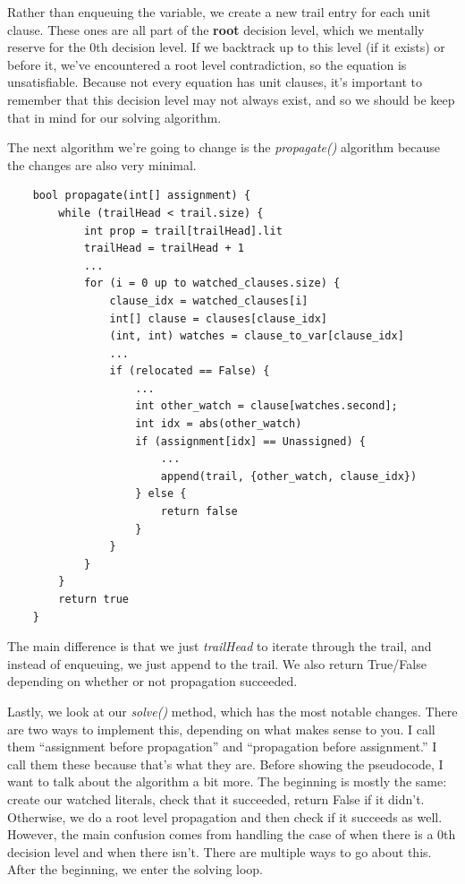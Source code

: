 \documentclass[oneside]{book}
\begin{document}
Rather than enqueuing the variable, we create a new trail entry for each unit 
clause. These ones are all part of the \textbf{root} decision level, which we 
mentally reserve for the 0th decision level. If we backtrack up to this level (if it exists)
or before it, we've encountered a root level contradiction, so the equation is 
unsatisfiable. Because not every equation has unit clauses, it's important to 
remember that this decision level may not always exist, and so we should be 
keep that in mind for our solving algorithm. 

The next algorithm we're going to change is the \textit{propagate()} algorithm 
because the changes are also very minimal.

\begin{lstlisting}
    bool propagate(int[] assignment) {
        while (trailHead < trail.size) {
            int prop = trail[trailHead].lit
            trailHead = trailHead + 1
            ...
            for (i = 0 up to watched_clauses.size) {
                clause_idx = watched_clauses[i]
                int[] clause = clauses[clause_idx]
                (int, int) watches = clause_to_var[clause_idx]
                ...
                if (relocated == False) {
                    ...
                    int other_watch = clause[watches.second];
                    int idx = abs(other_watch)
                    if (assignment[idx] == Unassigned) {
                        ...
                        append(trail, {other_watch, clause_idx})
                    } else {
                        return false
                    }
                }
            }
        }
        return true
    }
\end{lstlisting}

The main difference is that we just \textit{trailHead} to iterate through the trail, and 
instead of enqueuing, we just append to the trail. We also return True/False depending on 
whether or not propagation succeeded.

Lastly, we look at our \textit{solve()} method, which has the most notable changes.
There are two ways to implement this, depending on what makes sense to you. I call 
them ``assignment before propagation'' and ``propagation before assignment.'' I
call them these because that's what they are. Before showing the pseudocode, I 
want to talk about the algorithm a bit more. The beginning is mostly the same:
create our watched literals, check that it succeeded, return False if it didn't. 
Otherwise, we do a root level propagation and then check if it succeeds as well.
However, the main confusion comes from handling the case of when there is a 
0th decision level and when there isn't. There are multiple ways to go about this.
After the beginning, we enter the solving loop. 
\end{document}
